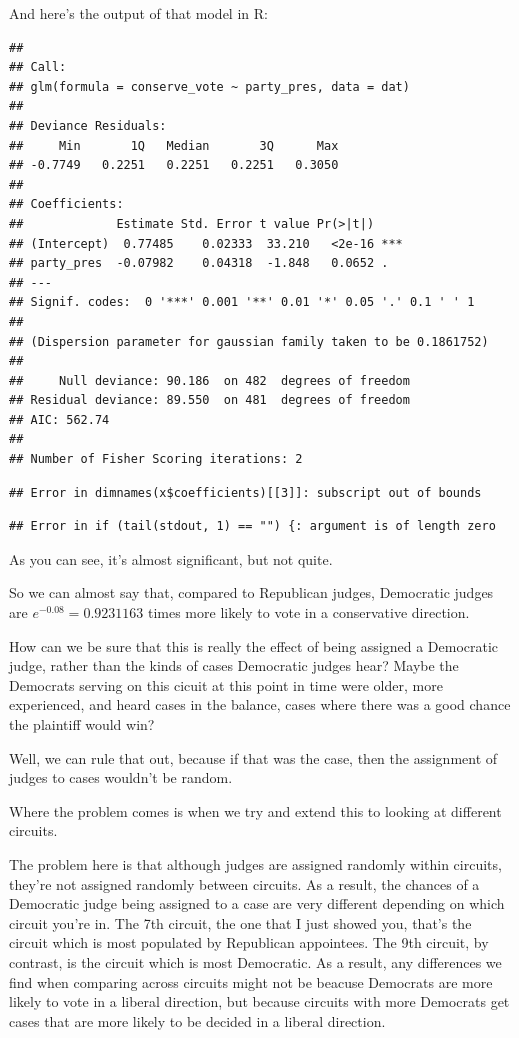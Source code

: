 \documentclass[12pt,twoside]{article}
\begin{document}
And here's the output of that model in R:

\begin{verbatim}
## 
## Call:
## glm(formula = conserve_vote ~ party_pres, data = dat)
## 
## Deviance Residuals: 
##     Min       1Q   Median       3Q      Max  
## -0.7749   0.2251   0.2251   0.2251   0.3050  
## 
## Coefficients:
##             Estimate Std. Error t value Pr(>|t|)    
## (Intercept)  0.77485    0.02333  33.210   <2e-16 ***
## party_pres  -0.07982    0.04318  -1.848   0.0652 .  
## ---
## Signif. codes:  0 '***' 0.001 '**' 0.01 '*' 0.05 '.' 0.1 ' ' 1
## 
## (Dispersion parameter for gaussian family taken to be 0.1861752)
## 
##     Null deviance: 90.186  on 482  degrees of freedom
## Residual deviance: 89.550  on 481  degrees of freedom
## AIC: 562.74
## 
## Number of Fisher Scoring iterations: 2
\end{verbatim}

\begin{verbatim}
## Error in dimnames(x$coefficients)[[3]]: subscript out of bounds
\end{verbatim}

\begin{verbatim}
## Error in if (tail(stdout, 1) == "") {: argument is of length zero
\end{verbatim}

As you can see, it's almost significant, but not quite.

So we can almost say that, compared to Republican judges, Democratic
judges are \(e^{-0.08} = 0.9231163\) times more likely to vote in a
conservative direction.

How can we be sure that this is really the effect of being assigned a
Democratic judge, rather than the kinds of cases Democratic judges hear?
Maybe the Democrats serving on this cicuit at this point in time were
older, more experienced, and heard cases in the balance, cases where
there was a good chance the plaintiff would win?

Well, we can rule that out, because if that was the case, then the
assignment of judges to cases wouldn't be random.

Where the problem comes is when we try and extend this to looking at
different circuits.

The problem here is that although judges are assigned randomly within
circuits, they're not assigned randomly between circuits. As a result,
the chances of a Democratic judge being assigned to a case are very
different depending on which circuit you're in. The 7th circuit, the one
that I just showed you, that's the circuit which is most populated by
Republican appointees. The 9th circuit, by contrast, is the circuit
which is most Democratic. As a result, any differences we find when
comparing across circuits might not be beacuse Democrats are more likely
to vote in a liberal direction, but because circuits with more Democrats
get cases that are more likely to be decided in a liberal direction.
\end{document}
